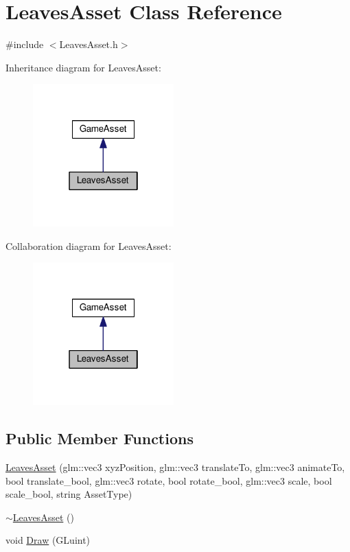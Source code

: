 \hypertarget{class_leaves_asset}{}\section{Leaves\+Asset Class Reference}
\label{class_leaves_asset}


{\ttfamily \#include $<$Leaves\+Asset.\+h$>$}



Inheritance diagram for Leaves\+Asset\+:\nopagebreak
\begin{figure}[H]
\begin{center}
\leavevmode
\includegraphics[width=154pt]{class_leaves_asset__inherit__graph}
\end{center}
\end{figure}


Collaboration diagram for Leaves\+Asset\+:\nopagebreak
\begin{figure}[H]
\begin{center}
\leavevmode
\includegraphics[width=154pt]{class_leaves_asset__coll__graph}
\end{center}
\end{figure}
\subsection*{Public Member Functions}
\begin{DoxyCompactItemize}
\item 
\hyperlink{class_leaves_asset_aa14436bbd45d5cce3e87bb79c2490a53}{Leaves\+Asset} (glm\+::vec3 xyz\+Position, glm\+::vec3 translate\+To, glm\+::vec3 animate\+To, bool translate\+\_\+bool, glm\+::vec3 rotate, bool rotate\+\_\+bool, glm\+::vec3 scale, bool scale\+\_\+bool, string Asset\+Type)
\item 
\hyperlink{class_leaves_asset_ae98d43a307f4c75cc8a661f0b36a213a}{$\sim$\+Leaves\+Asset} ()
\item 
void \hyperlink{class_leaves_asset_a807fd196b83e5adb131d489ef6645742}{Draw} (G\+Luint)
\end{DoxyCompactItemize}


